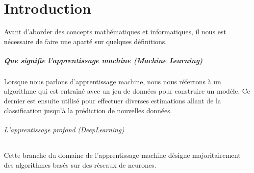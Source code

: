 \chapter{Introduction}
Avant d'aborder des concepts math\'ematiques et informatiques, il nous est n\'ecessaire de faire une apart\'e sur quelques d\'efinitions.

\paragraph{Que signifie l'apprentissage machine (Machine Learning)}
Lorsque nous parlons d'apprentissage machine, nous nous r\'eferrons \`a un algorithme qui est entra\^in\'e avec un jeu de donn\'ees pour construire un mod\`ele.
Ce dernier est ensuite utilis\'e pour effectuer diverses estimations allant de la classification jusqu'\`a la pr\'ediction de nouvelles donn\'ees.

\subparagraph{L'apprentissage profond (DeepLearning)}
Cette branche du domaine de l'apprentissage machine d\'esigne majoritairement des algorithmes basés sur des réseaux de neurones.
